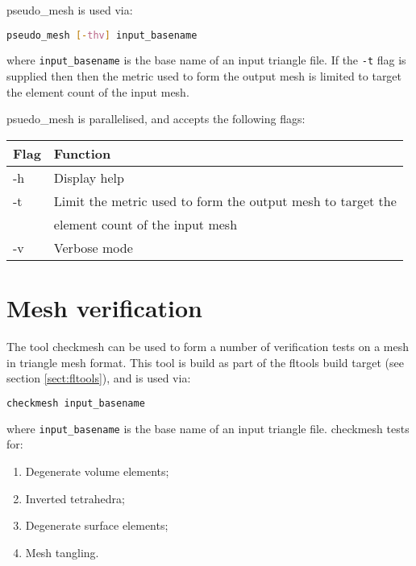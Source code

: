 pseudo\_mesh is used via:

\begin{lstlisting}[language = Bash]
pseudo_mesh [-thv] input_basename
\end{lstlisting}

where \lstinline[language = Bash]*input_basename* is the base name of an input
triangle file. If the \lstinline[language = Bash]*-t* flag is supplied then
then the metric used to form the output mesh is limited to target the element
count of the input mesh.

psuedo\_mesh is parallelised, and accepts the following flags:

\begin{center}
  \begin{tabular}{| l | l |}
    \hline
    Flag & Function \\
    \hline
    -h   & Display help \\
    -t   & Limit the metric used to form the output mesh to target the \\
         & element count of the input mesh \\
    -v   & Verbose mode \\
    \hline
  \end{tabular}
\end{center}

\section{Mesh verification}

The tool checkmesh can be used to form a number of verification tests on a mesh
in triangle mesh format. This tool is build as part of the fltools build target
(see section \ref{sect:fltools}), and is used via:

\begin{lstlisting}[language = Bash]
checkmesh input_basename
\end{lstlisting}

where \lstinline[language = Bash]*input_basename* is the base name of an input
triangle file. checkmesh tests for:

\begin{enumerate}
  \item Degenerate volume elements;
  \item Inverted tetrahedra;
  \item Degenerate surface elements;
  \item\label{item:mesh_tangling} Mesh tangling.
\end{enumerate}

